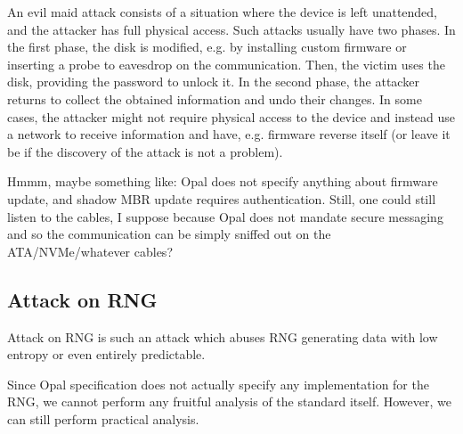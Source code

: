 An evil maid attack consists of a situation where the device is left unattended, and the attacker has full physical access. Such attacks usually have two phases. In the first phase, the disk is modified, e.g. by installing custom firmware or inserting a probe to eavesdrop on the communication. Then, the victim uses the disk, providing the password to unlock it. In the second phase, the attacker returns to collect the obtained information and undo their changes. In some cases, the attacker might not require physical access to the device and instead use a network to receive information and have, e.g. firmware reverse itself (or leave it be if the discovery of the attack is not a problem).

Hmmm, maybe something like: Opal does not specify anything about firmware update, and shadow MBR update requires authentication. Still, one could still listen to the cables, I suppose because Opal does not mandate secure messaging and so the communication can be simply sniffed out on the ATA/NVMe/whatever cables?

\subsection{Attack on RNG}
\label{attack_rng}

Attack on RNG is such an attack which abuses RNG generating data with low entropy or even entirely predictable. 

Since Opal specification does not actually specify any implementation for the RNG, we cannot perform any fruitful analysis of the standard itself. However, we can still perform practical analysis.

